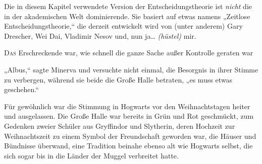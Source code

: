
\begin{chapterOpeningAuthorNote}
% 
Die in diesem Kapitel verwendete Version der Entscheidungstheorie ist \emph{nicht} die in der akademischen Welt dominierende. Sie basiert auf etwas namens „Zeitlose Entscheidungstheorie,“ die derzeit entwickelt wird von (unter anderem) Gary Drescher, Wei Dai, Vladimir Nesov und, nun ja… \emph{(hüstel)} mir.
\end{chapterOpeningAuthorNote}

\lettrine{D}{as} Erschreckende war, wie schnell die ganze Sache außer Kontrolle geraten war

„Albus,“ sagte Minerva und versuchte nicht einmal, die Besorgnis in ihrer Stimme zu verbergen, während sie beide die Große Halle betraten, „es muss etwas geschehen.“

Für gewöhnlich war die Stimmung in Hogwarts vor den Weihnachtstagen heiter und ausgelassen. Die Große Halle war bereits in Grün und Rot geschmückt, zum Gedenken zweier Schüler aus Gryffindor und Slytherin, deren Hochzeit zur Weihnachtszeit zu einem Symbol der Freundschaft geworden war, die Häuser und Bündnisse überwand, eine Tradition beinahe ebenso alt wie Hogwarts selbst, die sich sogar bis in die Länder der Muggel verbreitet hatte.%

